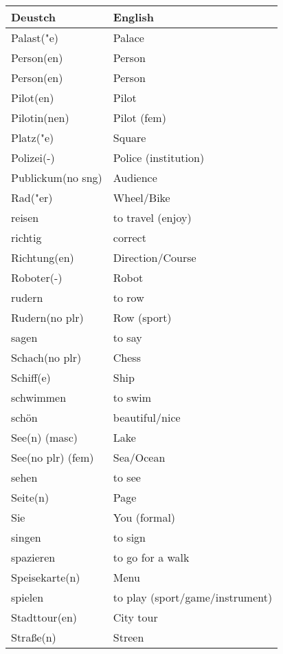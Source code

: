 \documentclass{article}
\renewcommand{\arraystretch}{1}
\begin{document}
\newpage

\begin{minipage}{0.48\textwidth}
    \centering
    \renewcommand{\arraystretch}{1.5}
    \begin{tabular}{|>{\raggedright\arraybackslash}p{3.5cm}|>{\raggedright\arraybackslash}p{3.5cm}|}
        \hline
        \rowcolor{gray!20} \textbf{Deustch} & \textbf{English} \\
        \hline
        Palast("e) & Palace \\\hline
        Person(en) & Person \\\hline
        Person(en) & Person \\\hline
        Pilot(en) & Pilot \\\hline
        Pilotin(nen) & Pilot (fem) \\\hline
        Platz("e) & Square \\\hline
        Polizei(-) & Police (institution) \\\hline
        Publickum(no sng) & Audience \\\hline
        Rad("er) & Wheel/Bike \\\hline
        reisen & to travel (enjoy) \\\hline
        richtig & correct \\\hline
        Richtung(en) & Direction/Course \\\hline
        Roboter(-) & Robot \\\hline
        rudern & to row \\\hline
        Rudern(no plr) & Row (sport) \\\hline
        sagen & to say \\\hline
        Schach(no plr) & Chess \\\hline
        Schiff(e) & Ship \\\hline
        schwimmen & to swim \\\hline
        schön & beautiful/nice \\\hline
        See(n) (masc) & Lake \\\hline
        See(no plr) (fem) & Sea/Ocean \\\hline
        sehen & to see \\\hline
        Seite(n) & Page \\\hline
        Sie & You (formal) \\\hline
        singen & to sign \\\hline
        spazieren & to go for a walk \\\hline
        Speisekarte(n) & Menu \\\hline
        spielen & to play (sport/game/instrument) \\\hline
        Stadttour(en) & City tour \\\hline
        Stra\ss{}e(n) & Streen \\\hline
    \end{tabular}
\end{minipage}%
\end{document}
